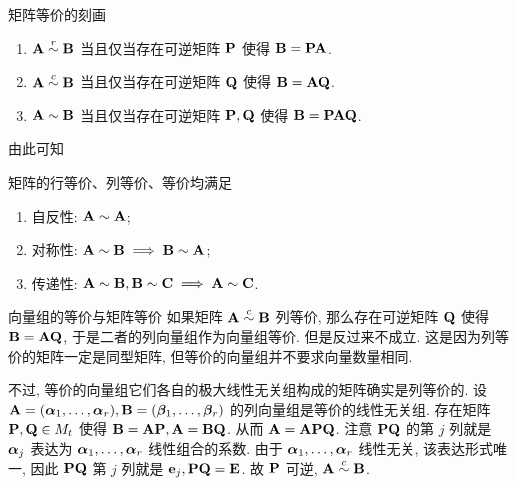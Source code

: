 \begin{frame}{矩阵等价的刻画}
	\onslide<+->
	\begin{theorem}
		\begin{enumerate}
			\item $\bfA\simr\bfB$ 当且仅当存在可逆矩阵 $\bfP$ 使得 $\bfB=\bfP\bfA$.
			\item $\bfA\simc\bfB$ 当且仅当存在可逆矩阵 $\bfQ$ 使得 $\bfB=\bfA\bfQ$.
			\item $\bfA\sim\bfB$ 当且仅当存在可逆矩阵 $\bfP,\bfQ$ 使得 $\bfB=\bfP\bfA\bfQ$.
		\end{enumerate}
	\end{theorem}
	\onslide<+->
	由此可知
	\begin{proposition}
		矩阵的行等价、列等价、等价均满足
		\begin{enumerate}
			\item 自反性: $\bfA\sim\bfA$;
			\item 对称性: $\bfA\sim\bfB\implies\bfB\sim\bfA$;
			\item 传递性: $\bfA\sim\bfB,\bfB\sim\bfC\implies\bfA\sim\bfC$.
		\end{enumerate}
	\end{proposition}
\end{frame}


\begin{frame}{向量组的等价与矩阵等价}
	\onslide<+->
	如果矩阵 $\bfA\simc\bfB$ 列等价, 那么存在可逆矩阵 $\bfQ$ 使得 $\bfB=\bfA\bfQ$, 于是二者的列向量组作为向量组等价.
	\onslide<+->
	但是反过来\alert{不成立}.
	\onslide<+->
	这是因为列等价的矩阵一定是同型矩阵, 但等价的向量组并不要求向量数量相同.

	\onslide<+->
	不过, 等价的向量组它们各自的极大线性无关组构成的矩阵确实是列等价的.
	\onslide<+->
	设 $\bfA=(\bma_1,\dots,\bma_r),\bfB=(\bmb_1,\dots,\bmb_r)$ 的列向量组是等价的线性无关组.
	\onslide<+->
	存在矩阵 $\bfP,\bfQ\in M_t$ 使得 $\bfB=\bfA\bfP,\bfA=\bfB\bfQ$.
	\onslide<+->
	从而 $\bfA=\bfA\bfP\bfQ$.
	\onslide<+->
	注意 $\bfP\bfQ$ 的第 $j$ 列就是 $\bma_j$ 表达为 $\bma_1,\dots,\bma_r$ 线性组合的系数.
	\onslide<+->
	由于 $\bma_1,\dots,\bma_r$ 线性无关, 该表达形式唯一, 因此 $\bfP\bfQ$ 第 $j$ 列就是 $\bfe_j, \bfP\bfQ=\bfE$.
	\onslide<+->
	故 $\bfP$ 可逆, $\bfA\simc\bfB$.
\end{frame}


